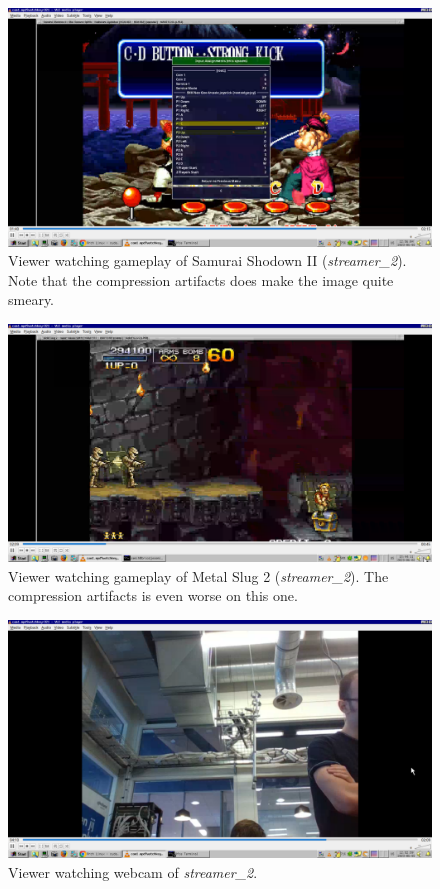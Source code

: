 \documentclass[a4paper,1pt]{article}
\begin{document}
\begin{figure}[H]
	\centering
	\includegraphics[width=\textwidth]{samsho2.png}
	\caption{Viewer watching gameplay of Samurai Shodown II (\textit{streamer\_2}). Note that the compression artifacts does make the image quite smeary.}
	\label{fig:samsho2}
\end{figure}

\begin{figure}[H]
	\centering
	\includegraphics[width=\textwidth]{mslug2.png}
	\caption{Viewer watching gameplay of Metal Slug 2 (\textit{streamer\_2}). The compression artifacts is even worse on this one.}
	\label{fig:mslug2}
\end{figure}

\begin{figure}[H]
	\centering
	\includegraphics[width=\textwidth]{webcam.png}
	\caption{Viewer watching webcam of \textit{streamer\_2}.}
	\label{fig:webcam}
\end{figure}
\end{document}
